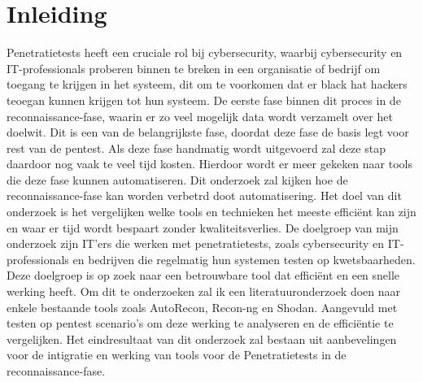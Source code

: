 


% 

\section{Inleiding}%
\label{sec:inleiding}

Penetratietests heeft een cruciale rol bij cybersecurity, waarbij cybersecurity en IT-professionals proberen binnen te breken in een organisatie of bedrijf om toegang te krijgen in het systeem, dit om te voorkomen dat er black hat hackers teoegan kunnen krijgen tot hun systeem. De eerste fase binnen  dit proces in de reconnaissance-fase, waarin er zo veel mogelijk data wordt verzamelt over het doelwit. Dit is een van de belangrijkste fase, doordat deze fase de basis legt voor rest van de pentest. Als deze fase handmatig wordt uitgevoerd zal deze stap daardoor nog vaak te veel tijd kosten. Hierdoor wordt er meer gekeken naar tools die deze fase kunnen automatiseren. Dit onderzoek zal kijken hoe de reconnaissance-fase kan worden verbetrd doot automatisering. Het doel van dit onderzoek is het vergelijken welke tools en technieken het meeste efficiënt kan zijn en waar er tijd wordt bespaart zonder kwaliteitsverlies.
De doelgroep van mijn onderzoek zijn IT’ers die werken met penetratietests, zoals cybersecurity en IT-professionals en bedrijven die regelmatig hun systemen testen op kwetsbaarheden. Deze doelgroep is op zoek naar een betrouwbare tool dat efficiënt en een snelle werking heeft. Om dit te onderzoeken zal ik een literatuuronderzoek doen naar enkele bestaande tools zoals AutoRecon, Recon-ng en Shodan. Aangevuld met testen op pentest scenario’s om deze werking te analyseren en de efficiëntie te vergelijken. Het eindresultaat van dit onderzoek zal bestaan uit aanbevelingen voor de intigratie en werking van tools voor de Penetratietests in de reconnaissance-fase.


